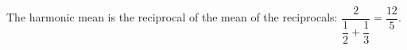 The harmonic mean is the reciprocal of the mean of the reciprocals: $\dfrac{2}{\dfrac{1}{2}+\dfrac{1}{3}}=\boxed{\dfrac{12}{5}}$.
